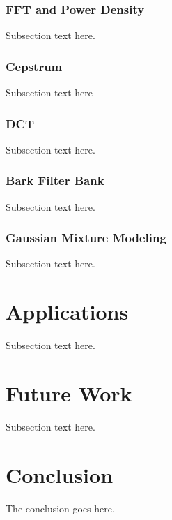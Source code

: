 \documentclass[journal]{IEEEtran}
\begin{document}
\subsubsection{FFT and Power Density}
Subsection text here.
\subsubsection{Cepstrum}
Subsection text here
\subsubsection{DCT}
Subsection text here.
\subsubsection{Bark Filter Bank}
Subsection text here.
\subsubsection{Gaussian Mixture Modeling}
Subsection text here.

\section{Applications}
Subsection text here.

\section{Future Work}
Subsection text here.

\section{Conclusion}
The conclusion goes here.


%
\end{document}
